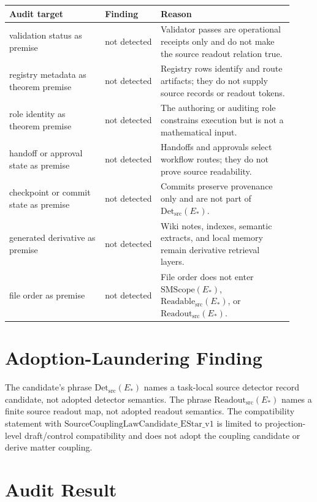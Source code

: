 \documentclass[11pt]{article}
\newcommand{\EStar}{E_{\ast}}
\newcommand{\SMScope}{\mathrm{SMScope}}
\newcommand{\ReadableSrc}{\mathrm{Readable}_{\mathrm{src}}}
\newcommand{\ReadoutSrc}{\mathrm{Readout}_{\mathrm{src}}}
\newcommand{\DetSrc}{\mathrm{Det}_{\mathrm{src}}}
\begin{document}
\begin{longtable}{p{0.31\linewidth}p{0.18\linewidth}p{0.43\linewidth}}
\toprule
Audit target & Finding & Reason \\
\midrule
validation status as premise & not detected & Validator passes are operational receipts only and do not make the source readout relation true. \\
registry metadata as theorem premise & not detected & Registry rows identify and route artifacts; they do not supply source records or readout tokens. \\
role identity as theorem premise & not detected & The authoring or auditing role constrains execution but is not a mathematical input. \\
handoff or approval state as premise & not detected & Handoffs and approvals select workflow routes; they do not prove source readability. \\
checkpoint or commit state as premise & not detected & Commits preserve provenance only and are not part of \(\DetSrc(\EStar)\). \\
generated derivative as premise & not detected & Wiki notes, indexes, semantic extracts, and local memory remain derivative retrieval layers. \\
file order as premise & not detected & File order does not enter \(\SMScope(\EStar)\), \(\ReadableSrc(\EStar)\), or \(\ReadoutSrc(\EStar)\). \\
\bottomrule
\end{longtable}

\section{Adoption-Laundering Finding}

The candidate's phrase \(\DetSrc(\EStar)\) names a task-local source detector
record candidate, not adopted detector semantics. The phrase
\(\ReadoutSrc(\EStar)\) names a finite source readout map, not adopted readout
semantics. The compatibility statement with
\(\mathrm{SourceCouplingLawCandidate\_EStar\_v1}\) is limited to
projection-level draft/control compatibility and does not adopt the coupling
candidate or derive matter coupling.

\section{Audit Result}
\end{document}
